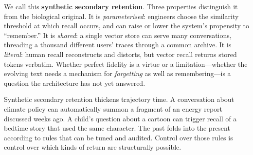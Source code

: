 We call this \textbf{synthetic secondary retention}. Three properties distinguish it from the biological original. It is \emph{parameterised}: engineers choose the similarity threshold at which recall occurs, and can raise or lower the system's propensity to ``remember.'' It is \emph{shared}: a single vector store can serve many conversations, threading a thousand different users' traces through a common archive. It is \emph{literal}: human recall reconstructs and distorts, but vector recall returns stored tokens verbatim. Whether perfect fidelity is a virtue or a limitation---whether the evolving text needs a mechanism for \emph{forgetting} as well as remembering---is a question the architecture has not yet answered.

Synthetic secondary retention thickens trajectory time. A conversation about climate policy can automatically summon a fragment of an energy report discussed weeks ago. A child's question about a cartoon can trigger recall of a bedtime story that used the same character. The past folds into the present according to rules that can be tuned and audited. Control over those rules is control over which kinds of return are structurally possible.


